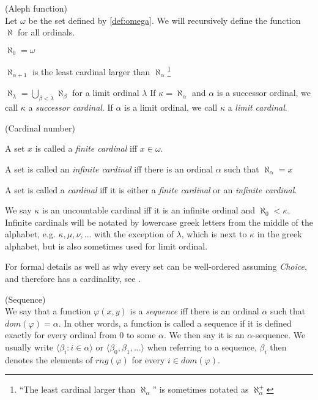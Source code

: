 \begin{definition}{(Aleph function)}\label{def:aleph}\\
Let $\omega$ be the set defined by \ref{def:omega}.
We will recursively define the function $\aleph$ for all ordinals.
\bce[(i)]
\item $\aleph_0 = \omega$
\item $\aleph_{\alpha+1}$ is the least cardinal larger than $\aleph_\alpha$\footnote{``The least cardinal larger than $\aleph_\alpha$'' is sometimes notated as $\aleph_\alpha^{+}$}
\item $\aleph_\lambda = \bigcup_{\beta < \lambda}\aleph_\beta$ for a limit ordinal $\lambda$
\ece
If $\kappa = \aleph_\alpha$ and $\alpha$ is a successor ordinal, we call $\kappa$ a \emph{successor cardinal}. If $\alpha$ is a limit ordinal, we call $\kappa$ a \emph{limit cardinal}.
\end{definition} %

\begin{definition}{(Cardinal number)}\label{def:cardinal}\\
\bce[(i)]
\item A set $x$ is called a \emph{finite cardinal} iff $x \in \omega$.
\item A set is called an \emph{infinite cardinal} iff there is an ordinal $\alpha$ such that $\aleph_\alpha = x$
\item A set is called a \emph{cardinal} iff it is either a \emph{finite cardinal} or an \emph{infinite cardinal}.
\ece
\end{definition}
We say $\kappa$ is an uncountable cardinal iff it is an infinite ordinal and $\aleph_0 < \kappa$.
Infinite cardinals will be notated by lowercase greek letters from the middle of the alphabet, e.g. $\kappa, \mu, \nu, \ldots$ with the exception of $\lambda$, which is next to $\kappa$ in the greek alphabet, but is also sometimes used for limit ordinal.

For formal details as well as why every set can be well-ordered assuming \emph{Choice}, and therefore has a cardinality, see \cite{JechBook}. %


\begin{definition}{(Sequence)}\label{def:sequence}\\
We say that a function $\varphi(x, y)$ is a \emph{sequence} iff there is an ordinal $\alpha$ such that $dom(\varphi) = \alpha$. In other words, a function is called a sequence if it is defined exactly for every ordinal from $0$ to some $\alpha$. We then say it is an $\alpha$-sequence. We usually write $\langle \beta_i : i \in \alpha \rangle$ or $\langle \beta_0, \beta_1, \ldots \rangle$ when referring to a sequence, $\beta_i$ then denotes the elements of $rng(\varphi)$ for every $i \in dom(\varphi)$.
\end{definition}

